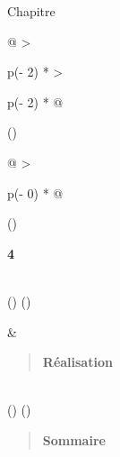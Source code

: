 \documentclass[
]{article}
\begin{document}
Chapitre

\begin{longtable}[]{@{}
  >{\raggedright\arraybackslash}p{(\columnwidth - 2\tabcolsep) * }
  >{\raggedright\arraybackslash}p{(\columnwidth - 2\tabcolsep) * }@{}}
\toprule()
\begin{minipage}[b]{\linewidth}\raggedright
\begin{longtable}[]{@{}
  >{\raggedright\arraybackslash}p{(\columnwidth - 0\tabcolsep) * }@{}}
\toprule()
\begin{minipage}[b]{\linewidth}\raggedright
\textbf{4}
\end{minipage} \\
\midrule()
\endhead
\bottomrule()
\end{longtable}
\end{minipage} & \begin{minipage}[b]{\linewidth}\raggedright
\begin{quote}
\textbf{Réalisation}
\end{quote}
\end{minipage} \\
\midrule()
\endhead
\bottomrule()
\end{longtable}

\begin{quote}
\textbf{Sommaire}
\end{quote}
\end{document}
